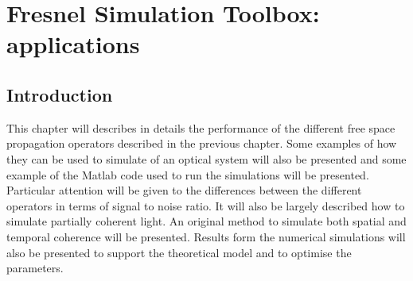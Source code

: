 \chapter{Fresnel Simulation Toolbox: applications}
\label{chap:fresnel2}
\section{Introduction}
This chapter will describes in details the performance of the different free space propagation operators described in the previous chapter. Some examples of how they can be used to simulate of an optical system will also be presented and some example of the Matlab code used to run the simulations will be presented. Particular attention will be given to the differences between the different operators in terms of signal to noise ratio.
It will also be largely described how to simulate partially coherent light. An original method to simulate both spatial and temporal coherence will be presented. Results form the numerical simulations will also be presented to support the theoretical model and to optimise the parameters.
